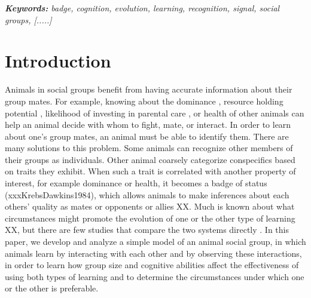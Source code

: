 \textit{\textbf{Keywords:} badge, cognition, evolution, learning, recognition, signal, social groups,  [.....]}

\newpage
\section*{Introduction} 
Animals in social groups benefit from having accurate information about their group mates. For example, knowing about the dominance \cite{Hobson:2015kx,Hobson:2015uq,Flack:2006fk,Brush:2013fk,Flack:2006uq,Cowlishaw:1990vn,Waal:1986ys}, resource holding potential \cite{Arnott:2009zr,Lemel:1993ve,Dick:1990cr}, likelihood of investing in parental care \cite{Olsen:2010uq,Qvarnstrom:1997fk}, or health \cite{Folstad:1992kx,Loyau:2005nx} of other animals can help an animal decide with whom to fight, mate, or interact. In order to learn about one's group mates, an animal must be able to identify them. There are many solutions to this problem. Some animals can recognize other members of their groups as individuals. Other animal coarsely categorize conspecifics based on traits they exhibit. When such a trait is correlated with another property of interest, for example dominance or health, it becomes a badge of status (xxxKrebsDawkins1984), which allows animals to make inferences about each others' quality as mates or opponents or allies XX. Much is known about what circumstances might promote the evolution of one or the other type of learning XX, but there are few studies that compare the two systems directly \cite{sheehan2016evotradeoff}. In this paper, we develop and analyze a simple model of an animal social group, in which animals learn by interacting with each other and by observing these interactions, in order to learn how group size and cognitive abilities affect the effectiveness of using both types of learning and to determine the circumstances under which one or the other is preferable. 

